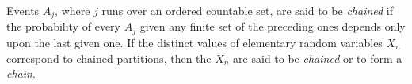 Events $A_j$, where $j$ runs over an ordered countable set, are said to be \textit{chained} if the probability of every $A_j$ given any finite set of the preceding ones depends only upon the last given one. If the distinct values of elementary random variables $X_n$ correspond to chained partitions, then the $X_n$ are said to be \textit{chained} or to form a \textit{chain}.
